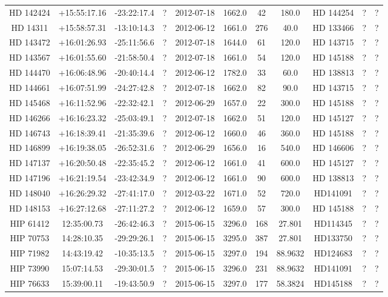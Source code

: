 \begin{table}
\begin{tabular}{ccccccccccc}
HD 142424 & +15:55:17.16 & -23:22:17.4 & ? & 2012-07-18 & 1662.0 & 42 & 180.0 & HD 144254 & ? & ? \\
HD 14311 & +15:58:57.31 & -13:10:14.3 & ? & 2012-06-12 & 1661.0 & 276 & 40.0 & HD 133466 & ? & ? \\
HD 143472 & +16:01:26.93 & -25:11:56.6 & ? & 2012-07-18 & 1644.0 & 61 & 120.0 & HD 143715 & ? & ? \\
HD 143567 & +16:01:55.60 & -21:58:50.4 & ? & 2012-07-18 & 1661.0 & 54 & 120.0 & HD 145188 & ? & ? \\
HD 144470 & +16:06:48.96 & -20:40:14.4 & ? & 2012-06-12 & 1782.0 & 33 & 60.0 & HD 138813 & ? & ? \\
HD 144661 & +16:07:51.99 & -24:27:42.8 & ? & 2012-07-18 & 1662.0 & 82 & 90.0 & HD 143715 & ? & ? \\
HD 145468 & +16:11:52.96 & -22:32:42.1 & ? & 2012-06-29 & 1657.0 & 22 & 300.0 & HD 145188 & ? & ? \\
HD 146266 & +16:16:23.32 & -25:03:49.1 & ? & 2012-07-18 & 1662.0 & 51 & 120.0 & HD 145127 & ? & ? \\
HD 146743 & +16:18:39.41 & -21:35:39.6 & ? & 2012-06-12 & 1660.0 & 46 & 360.0 & HD 145188 & ? & ? \\
HD 146899 & +16:19:38.05 & -26:52:31.6 & ? & 2012-06-29 & 1656.0 & 16 & 540.0 & HD 146606 & ? & ? \\
HD 147137 & +16:20:50.48 & -22:35:45.2 & ? & 2012-06-12 & 1661.0 & 41 & 600.0 & HD 145127 & ? & ? \\
HD 147196 & +16:21:19.54 & -23:42:34.9 & ? & 2012-06-12 & 1661.0 & 90 & 600.0 & HD 138813 & ? & ? \\
HD 148040 & +16:26:29.32 & -27:41:17.0 & ? & 2012-03-22 & 1671.0 & 52 & 720.0 & HD141091 & ? & ? \\
HD 148153 & +16:27:12.68 & -27:11:27.2 & ? & 2012-06-12 & 1659.0 & 57 & 300.0 & HD 145188 & ? & ? \\
HIP 61412 & 12:35:00.73 & -26:42:46.3 & ? & 2015-06-15 & 3296.0 & 168 & 27.801 & HD114345 & ? & ? \\
HIP 70753 & 14:28:10.35 & -29:29:26.1 & ? & 2015-06-15 & 3295.0 & 387 & 27.801 & HD133750 & ? & ? \\
HIP 71982 & 14:43:19.42 & -10:35:13.5 & ? & 2015-06-15 & 3297.0 & 194 & 88.9632 & HD124683 & ? & ? \\
HIP 73990 & 15:07:14.53 & -29:30:01.5 & ? & 2015-06-15 & 3296.0 & 231 & 88.9632 & HD141091 & ? & ? \\
HIP 76633 & 15:39:00.11 & -19:43:50.9 & ? & 2015-06-15 & 3297.0 & 177 & 58.3824 & HD145188 & ? & ? \\

\end{tabular}
\end{table}
